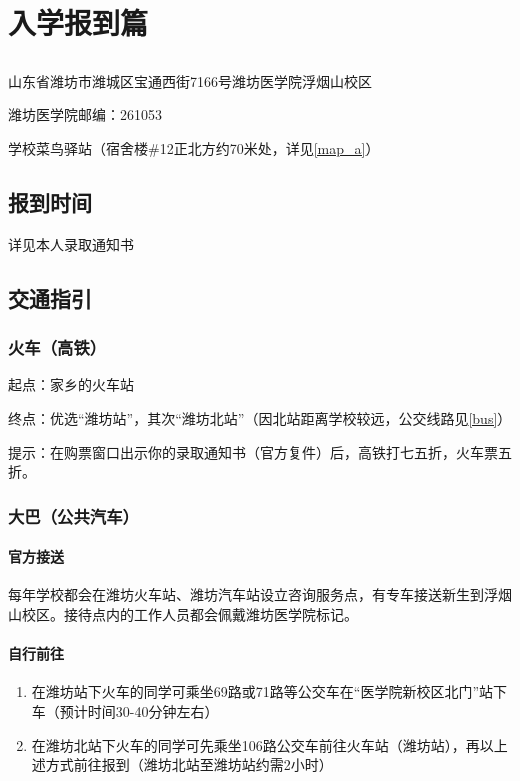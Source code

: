 \chapter[入学报到篇]{入学报到篇}
\section[报道地址（也是快递地址）]{}
山东省潍坊市潍城区宝通西街7166号潍坊医学院浮烟山校区

潍坊医学院邮编：261053

学校菜鸟驿站（宿舍楼\#12正北方约70米处，详见\ref{map_a}）

\section[报到时间]{报到时间}
详见本人录取通知书

\section[交通指引]{交通指引}
\subsection[火车（高铁）]{火车（高铁）}
起点：家乡的火车站

终点：优选“潍坊站”，其次“潍坊北站”（因北站距离学校较远，公交线路见\ref{bus}）

提示：在购票窗口出示你的录取通知书（官方复件）后，高铁打七五折，火车票五折。

\subsection[大巴（公共汽车）]{大巴（公共汽车）}

\subsubsection[官方接送]{官方接送}
每年学校都会在潍坊火车站、潍坊汽车站设立咨询服务点，有专车接送新生到浮烟山校区。接待点内的工作人员都会佩戴潍坊医学院标记。

\subsubsection[自行前往]{自行前往}
\begin{enumerate}
    \item 在潍坊站下火车的同学可乘坐69路或71路等公交车在“医学院新校区北门”站下车（预计时间30-40分钟左右）\label{bus}
    \item 在潍坊北站下火车的同学可先乘坐106路公交车前往火车站（潍坊站），再以上述方式前往报到（潍坊北站至潍坊站约需2小时）
\end{enumerate}

